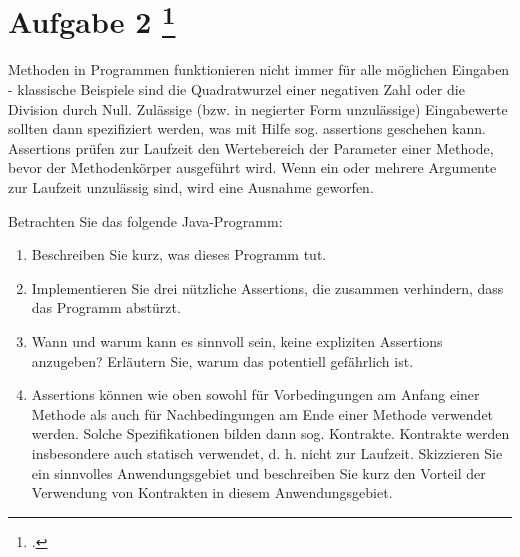 \documentclass{lehramt-informatik-aufgabe}
\begin{document}
\section{Aufgabe 2
\footcite{examen:66116:2019:09}}

Methoden in Programmen funktionieren nicht immer für alle möglichen
Eingaben - klassische Beispiele sind die Quadratwurzel einer negativen
Zahl oder die Division durch Null. Zulässige (bzw. in negierter Form
unzulässige) Eingabewerte sollten dann spezifiziert werden, was mit
Hilfe sog. assertions geschehen kann. Assertions prüfen zur Laufzeit den
Wertebereich der Parameter einer Methode, bevor der Methodenkörper
ausgeführt wird. Wenn ein oder mehrere Argumente zur Laufzeit unzulässig
sind, wird eine Ausnahme geworfen.


Betrachten Sie das folgende Java-Programm:

\begin{enumerate}


\item Beschreiben Sie kurz, was dieses Programm tut.


\item Implementieren Sie drei nützliche Assertions, die zusammen
verhindern, dass das Programm abstürzt.


\item Wann und warum kann es sinnvoll sein, keine expliziten Assertions
anzugeben? Erläutern Sie, warum das potentiell gefährlich ist.


\item Assertions können wie oben sowohl für Vorbedingungen am Anfang
einer Methode als auch für Nachbedingungen am Ende einer Methode
verwendet werden. Solche Spezifikationen bilden dann sog. Kontrakte.
Kontrakte werden insbesondere auch statisch verwendet, d. h. nicht zur
Laufzeit. Skizzieren Sie ein sinnvolles Anwendungsgebiet und beschreiben
Sie kurz den Vorteil der Verwendung von Kontrakten in diesem
Anwendungsgebiet.

\end{enumerate}
\end{document}
